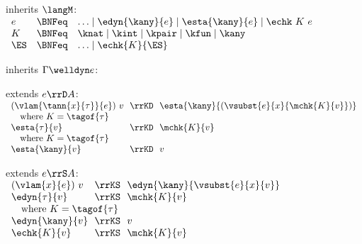 \begin{flushleft}

\begin{minipage}[t]{\columnwidth}
 inherits $\langM$:\\
$\begin{array}{l c l}
  e & \BNFeq & \ldots \mid \edyn{\kany}{e} \mid \esta{\kany}{e} \mid \echk~K~e
\\
  K & \BNFeq & \knat \mid \kint \mid \kpair \mid \kfun \mid \kany
\\
  \ES & \BNFeq & \ldots \mid \echk{K}{\ES}
\end{array}$

\medskip
{} inherits $\Gamma \welldyn e$:
\begin{mathpar}



\end{mathpar}

\medskip
{} extends $e \rrD A$:\\
$\begin{array}{l@{~~}c@{~~}l}
  (\vlam{\tann{x}{\tau}}{e})~v & \rrKD & \esta{\kany}{(\vsubst{e}{x}{\mchk{K}{v}})}
\\ \multicolumn{3}{l}{\mbox{\quad where $K = \tagof{\tau}$}}
\\
  \esta{\tau}{v} & \rrKD & \mchk{K}{v}
\\ \multicolumn{3}{l}{\mbox{\quad where $K = \tagof{\tau}$}}
\\
  \esta{\kany}{v} & \rrKD & v
\end{array}$

\medskip
{} extends $e \rrS A$:\\
$\begin{array}{l@{~~}c@{~~}l}
  (\vlam{x}{e})~v & \rrKS & \edyn{\kany}{\vsubst{e}{x}{v}}
\\
  \edyn{\tau}{v} & \rrKS & \mchk{K}{v}
\\ \multicolumn{3}{l}{\mbox{\quad where $K = \tagof{\tau}$}}
\\
  \edyn{\kany}{v} & \rrKS & v
\\
  \echk{K}{v} & \rrKS & \mchk{K}{v}
\end{array}$


\end{minipage}
\end{flushleft}
